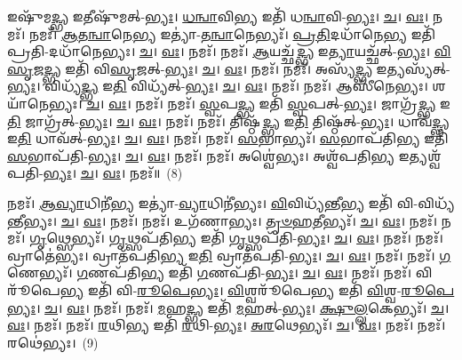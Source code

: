 𑌇𑌷𑍁᳴𑌮\-\ul{𑌦𑍍𑌭𑍍𑌯} 𑌇𑌤𑍀𑌷𑍁᳴𑌮𑌤𑍍-\-\ul{𑌭𑍍𑌯𑌃}\-। \ul{𑌧}\-\-\ul{𑌨𑍍𑌵𑌾}\-𑌵𑌿\-\ul{𑌭𑍍𑌯} 𑌇𑌤𑌿᳴ 𑌧\-\ul{𑌨𑍍𑌵𑌾}\-𑌵𑌿-\-\ul{𑌭𑍍𑌯𑌃}\-। \ul{𑌚}\-। \ul{𑌵𑌃}\-। 𑌨𑌮𑌃᳴। 
𑌨𑌮𑌃᳴। \ul{𑌆}\-\-\ul{𑌤}\-\-\ul{𑌨𑍍𑌵𑌾}\-𑌨𑍇\-\ul{𑌭𑍍𑌯} 𑌇𑌤𑍍𑌯𑌾॑-\-\ul{𑌤}\-\-\ul{𑌨𑍍𑌵𑌾}\-𑌨𑍇𑌭𑍍𑌯𑌃᳴। \ul{𑌪𑍍𑌰}\-\-\ul{𑌤𑌿}\-𑌦𑌧𑌾᳴𑌨𑍇\-\ul{𑌭𑍍𑌯} 𑌇𑌤𑌿᳴ 𑌪𑍍𑌰𑌤𑌿-𑌦𑌧𑌾᳴𑌨𑍇𑌭𑍍𑌯𑌃। \ul{𑌚}\-। \ul{𑌵𑌃}\-। 𑌨𑌮𑌃᳴। 
𑌨𑌮𑌃᳴। \ul{𑌆}\-𑌯𑌚𑍍𑌛᳴\-\ul{𑌦𑍍𑌭𑍍𑌯} 𑌇\-\ul{𑌤𑍍𑌯𑌾}\-𑌯𑌚𑍍𑌛᳴𑌤𑍍-\-\ul{𑌭𑍍𑌯𑌃}\-। \ul{𑌵𑌿}\-\-\ul{𑌸𑍃}\-𑌜\-\ul{𑌦𑍍𑌭𑍍𑌯} 𑌇𑌤𑌿᳴ 𑌵𑌿\-\ul{𑌸𑍃}\-𑌜𑌤𑍍-\-\ul{𑌭𑍍𑌯𑌃}\-। \ul{𑌚}\-। \ul{𑌵𑌃}\-। 𑌨𑌮𑌃᳴। 
𑌨𑌮𑌃᳴। 𑌅𑌸𑍍𑌯᳴\-\ul{𑌦𑍍𑌭𑍍𑌯} 𑌇𑌤𑍍𑌯𑌸𑍍𑌯᳴𑌤𑍍-\-\ul{𑌭𑍍𑌯𑌃}\-। 𑌵𑌿𑌧𑍍𑌯᳴\-\ul{𑌦𑍍𑌭𑍍𑌯} 𑌇\-\ul{𑌤𑌿} 𑌵𑌿𑌧𑍍𑌯᳴𑌤𑍍-\-\ul{𑌭𑍍𑌯𑌃}\-। \ul{𑌚}\-। \ul{𑌵𑌃}\-। 𑌨𑌮𑌃᳴। 
𑌨𑌮𑌃᳴। 𑌆𑌸𑍀᳴𑌨𑍇𑌭𑍍𑌯𑌃। 𑌶𑌯𑌾᳴𑌨𑍇𑌭𑍍𑌯𑌃। \ul{𑌚}\-। \ul{𑌵𑌃}\-। 𑌨𑌮𑌃᳴। 
𑌨𑌮𑌃᳴। \ul{𑌸𑍍𑌵}\-𑌪\-\ul{𑌦𑍍𑌭𑍍𑌯} 𑌇𑌤𑌿᳴ \ul{𑌸𑍍𑌵}\-𑌪𑌤𑍍-\-\ul{𑌭𑍍𑌯𑌃}\-। 𑌜𑌾𑌗𑍍𑌰᳴\-\ul{𑌦𑍍𑌭𑍍𑌯} 𑌇\-\ul{𑌤𑌿} 𑌜𑌾𑌗𑍍𑌰᳴𑌤𑍍-\-\ul{𑌭𑍍𑌯𑌃}\-। \ul{𑌚}\-। \ul{𑌵𑌃}\-। 𑌨𑌮𑌃᳴। 
𑌨𑌮𑌃᳴। 𑌤𑌿𑌷𑍍𑌠᳴\-\ul{𑌦𑍍𑌭𑍍𑌯} 𑌇\-\ul{𑌤𑌿} 𑌤𑌿𑌷𑍍𑌠᳴𑌤𑍍-\-\ul{𑌭𑍍𑌯𑌃}\-। 𑌧𑌾𑌵᳴\-\ul{𑌦𑍍𑌭𑍍𑌯} 𑌇\-\ul{𑌤𑌿} 𑌧𑌾𑌵᳴𑌤𑍍-\-\ul{𑌭𑍍𑌯𑌃}\-। \ul{𑌚}\-। \ul{𑌵𑌃}\-। 𑌨𑌮𑌃᳴। 
𑌨𑌮𑌃᳴। \ul{𑌸}\-𑌭𑌾𑌭𑍍𑌯𑌃᳴। \ul{𑌸}\-𑌭𑌾𑌪᳴𑌤𑌿\-\ul{𑌭𑍍𑌯} 𑌇𑌤𑌿᳴ \ul{𑌸}\-𑌭𑌾𑌪᳴𑌤𑌿-\-\ul{𑌭𑍍𑌯𑌃}\-। \ul{𑌚}\-। \ul{𑌵𑌃}\-। 𑌨𑌮𑌃᳴। 
𑌨𑌮𑌃᳴। 𑌅𑌶𑍍𑌵𑍇॑𑌭𑍍𑌯𑌃। 𑌅𑌶𑍍𑌵᳴𑌪𑌤𑌿\-\ul{𑌭𑍍𑌯} 𑌇𑌤𑍍𑌯𑌶𑍍𑌵᳴𑌪𑌤𑌿-\-\ul{𑌭𑍍𑌯𑌃}\-। \ul{𑌚}\-। \ul{𑌵𑌃}\-। 𑌨𑌮𑌃᳴॥~(8)


𑌨𑌮𑌃᳴। \ul{𑌆}\-\-\ul{𑌵𑍍𑌯𑌾}\-𑌧𑌿𑌨𑍀॑\-\ul{𑌭𑍍𑌯} 𑌇𑌤𑍍𑌯𑌾॑-\-\ul{𑌵𑍍𑌯𑌾}\-𑌧𑌿𑌨𑍀॑𑌭𑍍𑌯𑌃। \ul{𑌵𑌿}\-𑌵𑌿𑌧𑍍𑌯᳴𑌨𑍍𑌤𑍀\-\ul{𑌭𑍍𑌯} 𑌇𑌤𑌿᳴ 𑌵𑌿-𑌵𑌿𑌧𑍍𑌯᳴𑌨𑍍𑌤𑍀𑌭𑍍𑌯𑌃। \ul{𑌚}\-। \ul{𑌵𑌃}\-। 𑌨𑌮𑌃᳴। 𑌨𑌮𑌃᳴। 𑌉𑌗᳴𑌣𑌾𑌭𑍍𑌯𑌃। \ul{𑌤𑍃}\-\-\ul{𑍞}\-\-\ul{𑌹}\-𑌤𑍀𑌭𑍍𑌯𑌃᳴। \ul{𑌚}\-। \ul{𑌵𑌃}\-। 𑌨𑌮𑌃᳴। 
𑌨𑌮𑌃᳴। \ul{𑌗𑍃}\-𑌥𑍍𑌸𑍇𑌭𑍍𑌯𑌃᳴। \ul{𑌗𑍃}\-𑌥𑍍𑌸𑌪᳴𑌤𑌿\-\ul{𑌭𑍍𑌯} 𑌇𑌤𑌿᳴ \ul{𑌗𑍃}\-𑌥𑍍𑌸𑌪᳴𑌤𑌿-\-\ul{𑌭𑍍𑌯𑌃}\-। \ul{𑌚}\-। \ul{𑌵𑌃}\-। 𑌨𑌮𑌃᳴। 
𑌨𑌮𑌃᳴। 𑌵𑍍𑌰𑌾𑌤𑍇॑𑌭𑍍𑌯𑌃। 𑌵𑍍𑌰𑌾𑌤᳴𑌪𑌤𑌿\-\ul{𑌭𑍍𑌯} 𑌇\-\ul{𑌤𑌿} 𑌵𑍍𑌰𑌾𑌤᳴𑌪𑌤𑌿-\-\ul{𑌭𑍍𑌯𑌃}\-। \ul{𑌚}\-। \ul{𑌵𑌃}\-। 𑌨𑌮𑌃᳴। 
𑌨𑌮𑌃᳴। \ul{𑌗}\-𑌣𑍇𑌭𑍍𑌯𑌃᳴। \ul{𑌗}\-𑌣𑌪᳴𑌤𑌿\-\ul{𑌭𑍍𑌯} 𑌇𑌤𑌿᳴ \ul{𑌗}\-𑌣𑌪᳴𑌤𑌿-\-\ul{𑌭𑍍𑌯𑌃}\-। \ul{𑌚}\-। \ul{𑌵𑌃}\-। 𑌨𑌮𑌃᳴। 
𑌨𑌮𑌃᳴। 𑌵𑌿𑌰𑍂᳴𑌪𑍇\-\ul{𑌭𑍍𑌯} 𑌇𑌤𑌿᳴ 𑌵𑌿-\-\ul{𑌰𑍂}\-\-\ul{𑌪𑍇}\-\-\ul{𑌭𑍍𑌯𑌃}\-। \ul{𑌵𑌿}\-𑌶𑍍𑌵𑌰𑍂᳴𑌪𑍇\-\ul{𑌭𑍍𑌯} 𑌇𑌤𑌿᳴ \ul{𑌵𑌿}\-𑌶𑍍𑌵-\-\ul{𑌰𑍂}\-\-\ul{𑌪𑍇}\-\-\ul{𑌭𑍍𑌯𑌃}\-। \ul{𑌚}\-। \ul{𑌵𑌃}\-। 𑌨𑌮𑌃᳴। 
𑌨𑌮𑌃᳴। \ul{𑌮}\-𑌹\-\ul{𑌦𑍍𑌭𑍍𑌯} 𑌇𑌤𑌿᳴ \ul{𑌮}\-𑌹𑌤𑍍-\-\ul{𑌭𑍍𑌯𑌃}\-। \ul{𑌕𑍍𑌷𑍁}\-\-\ul{𑌲𑍍𑌲}\-𑌕𑍇𑌭𑍍𑌯𑌃᳴। \ul{𑌚}\-। \ul{𑌵𑌃}\-। 𑌨𑌮𑌃᳴। 
𑌨𑌮𑌃᳴। \ul{𑌰}\-𑌥𑌿\-\ul{𑌭𑍍𑌯} 𑌇𑌤𑌿᳴ \ul{𑌰}\-𑌥𑌿-\-\ul{𑌭𑍍𑌯𑌃}\-। \ul{𑌅}\-\-\ul{𑌰}\-𑌥𑍇𑌭𑍍𑌯𑌃᳴। \ul{𑌚}\-। \ul{𑌵𑌃}\-। 𑌨𑌮𑌃᳴। 
𑌨𑌮𑌃᳴। 𑌰𑌥𑍇॑𑌭𑍍𑌯𑌃।~(9)


